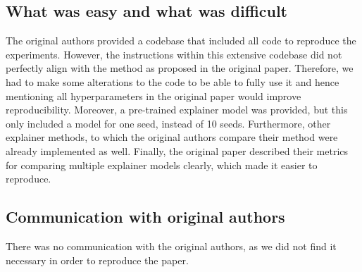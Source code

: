 \subsection*{What was easy and what was difficult}
The original authors provided a codebase that included all code to reproduce the experiments. However, the instructions within this extensive codebase did not perfectly align with the method as proposed in the original paper. Therefore, we had to make some alterations to the code to be able to fully use it and hence mentioning all hyperparameters in the original paper would improve reproducibility. Moreover, a pre-trained explainer model was provided, but this only included a model for one seed, instead of 10 seeds. Furthermore, other explainer methods, to which the original authors compare their method were already implemented as well. Finally, the original paper described their metrics for comparing multiple explainer models clearly, which made it easier to reproduce. 



\subsection*{Communication with original authors}
There was no communication with the original authors, as we did not find it necessary in order to reproduce the paper.
